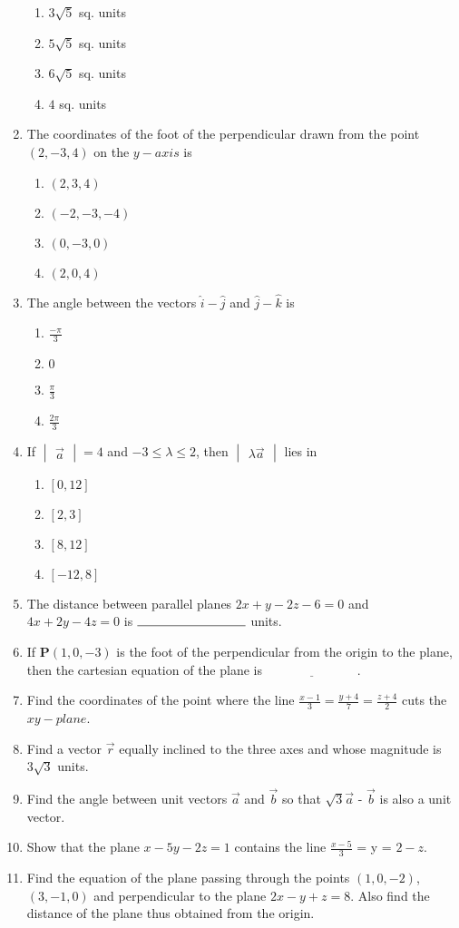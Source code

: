 \documentclass[12pt,-letter paper]{article}
\let\vec\mathbf{}
\let\vec\mathbf{}
\providecommand{\mydet}[1]{\ensuremath{\begin{vmatrix}#1\end{vmatrix}}}               \providecommand{\myvec}[1]{\ensuremath{\begin{bmatrix}#1\end{bmatrix}}}
\providecommand{\sbrak}[1]{\ensuremath{{}\left[#1\right]}}
\providecommand{\brak}[1]{\ensuremath{\left(#1\right)}}
\begin{document}
\begin{enumerate}
\begin{enumerate}
\item $3\sqrt{5}$ sq. units
\item $5\sqrt{5}$ sq. units
\item $6\sqrt{5}$ sq. units
\item $4$ sq. units
\end{enumerate}
\item The coordinates of the foot of the perpendicular drawn from the point $\brak{2,-3,4}$ on the $y-axis$ is
\begin{enumerate}
\item $\brak{2, 3, 4}$
\item $\brak{-2,-3,-4}$
\item $\brak{0,-3, 0}$
\item $\brak{2, 0,4}$
\end{enumerate}
\item The angle between the vectors $\hat{i} - \hat{j}$ and $\hat{j} - \hat{k}$ is
\begin{enumerate}
\item $\frac{-\pi}{3}$
\item $0$
\item $\frac{\pi}{3}$
\item $\frac{2\pi}{3}$
\end{enumerate}
\item If $\mydet{\overrightarrow{a}}= 4$ and $-3 \leq \lambda \leq 2$, then $\mydet{\lambda \overrightarrow a}$ lies in
\begin{enumerate}
\item $\sbrak{0,12}$
\item $\sbrak{2,3}$
\item $\sbrak{8,12}$
\item $\sbrak{-12,8}$
\end{enumerate}
\item The distance between parallel planes $2x + y - 2z - 6 = 0$ and $4x + 2y - 4z = 0$ is $\rule{3cm}{0.15mm}$ units.
\item If $\vec{P}\brak{1,  0, -3}$ is the foot of the perpendicular from the origin to the plane, then the cartesian equation of the plane is $\underline{\hspace{3cm}}$.
\item Find the coordinates of the point where the line $\frac{x-1}{3} = \frac{y+4}{7} = \frac{z+4}{2}$ cuts the $xy-plane$.
\item Find a vector $\overrightarrow{r}$ equally inclined to the three axes and whose magnitude is $3\sqrt{3}$ units.
\item Find the angle between unit vectors $\overrightarrow{a}$ and $\overrightarrow{b}$ so that $\sqrt{3}\overrightarrow{a}$ - $\overrightarrow{b}$ is also a unit vector.
\item Show that the plane $x - 5y - 2z = 1$ contains the line $\frac{x - 5}{3}$ = y = $2 -z$.
\item Find the equation of the plane passing through the points $\brak{1, 0, -2}$,  $\brak{3, -1, 0}$ and perpendicular to the plane $2x - y + z = 8$. Also find the distance of the plane thus obtained from the origin.
\end{enumerate}
\end{document}
